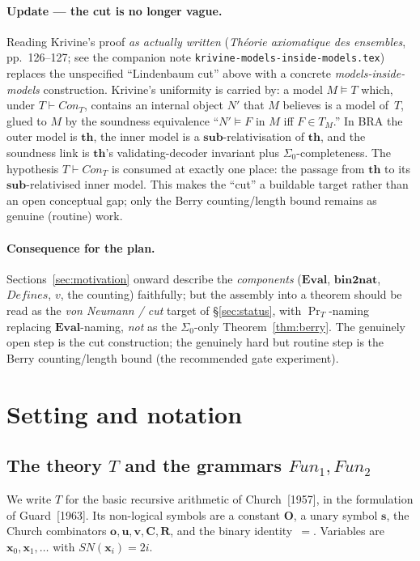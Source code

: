 \documentclass[11pt]{article}
\theoremstyle{plain}
\theoremstyle{definition}
\theoremstyle{remark}
\newcommand{\Fun}{\mathit{Fun}}
\newcommand{\Defines}{\mathit{Defines}}
\newcommand{\Con}{\mathit{Con}}
\newcommand{\SN}{\mathit{SN}}
\newcommand{\Eval}{\mathbf{Eval}}
\newcommand{\bnt}{\mathbf{bin2nat}}
\begin{document}
\paragraph{Update --- the cut is no longer vague.}  Reading Krivine's
proof \emph{as actually written} (\emph{Th\'eorie axiomatique des
ensembles}, pp.~126--127; see the companion note
\texttt{krivine-models-inside-models.tex}) replaces the unspecified
``Lindenbaum cut'' above with a concrete \emph{models-inside-models}
construction.  Krivine's uniformity is carried by: a model $M\models T$
which, under $T\vdash\Con_T$, contains an internal object $N'$ that $M$
believes is a model of~$T$, glued to $M$ by the soundness equivalence
``$N'\models F$ in $M$ iff $F\in T_M$.''  In BRA the outer model is
$\mathbf{th}$, the inner model is a $\mathbf{sub}$-relativisation of $\mathbf{th}$, and the
soundness link is $\mathbf{th}$'s validating-decoder invariant plus
$\Sigma_0$-completeness.  The hypothesis $T\vdash\Con_T$ is consumed at
exactly one place: the passage from $\mathbf{th}$ to its $\mathbf{sub}$-relativised
inner model.  This makes the ``cut'' a buildable target rather than an
open conceptual gap; only the Berry counting/length bound remains as
genuine (routine) work.

\paragraph{Consequence for the plan.}  Sections~\ref{sec:motivation}
onward describe the \emph{components} ($\Eval$, $\bnt$, $\Defines$,
$v$, the counting) faithfully; but the assembly into a theorem should
be read as the \emph{von Neumann / cut} target of {\S}\ref{sec:status},
with $\Pr_T$-naming replacing $\Eval$-naming, \emph{not} as the
$\Sigma_0$-only Theorem~\ref{thm:berry}.  The genuinely open step is
the cut construction; the genuinely hard but routine step is the Berry
counting/length bound (the recommended gate experiment).

\section{Setting and notation}

\subsection{The theory $T$ and the grammars $\Fun_1, \Fun_2$}

We write $T$ for the basic recursive arithmetic of Church~[1957], in
the formulation of Guard~[1963].  Its non-logical symbols are a
constant $\mathbf{O}$, a unary symbol $\mathbf{s}$, the Church
combinators $\mathbf{o}, \mathbf{u}, \mathbf{v}, \mathbf{C},
\mathbf{R}$, and the binary identity~$=$.  Variables are $\mathbf{x}_0,
\mathbf{x}_1, \ldots$ with $\SN(\mathbf{x}_i) = 2i$.
\end{document}
